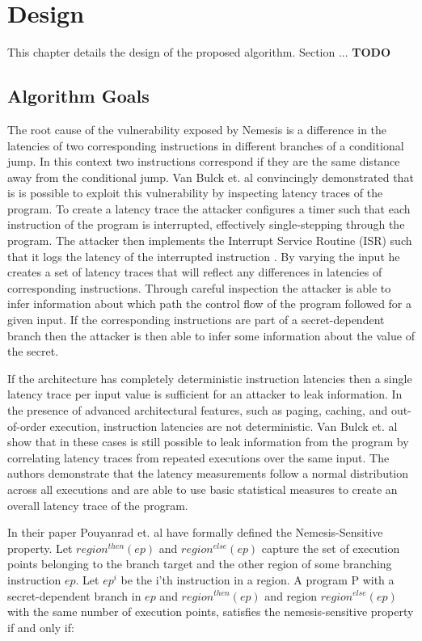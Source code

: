 \chapter{Design}
\label{cha:design}

This chapter details the design of the proposed algorithm. Section ... \textbf{TODO}

\section{Algorithm Goals}
\label{sec:goals}
The root cause of the vulnerability exposed by Nemesis is a difference in the latencies of two corresponding instructions in different branches of a 
conditional jump. 
In this context two instructions correspond if they are the same distance away from the conditional jump. 
Van Bulck et. al \cite{Nemesis} convincingly demonstrated that is is possible to exploit this vulnerability by inspecting latency traces of the program.
To create a latency trace the attacker configures a timer such that each instruction of the program is interrupted, effectively single-stepping through the program. 
The attacker then implements the Interrupt Service Routine (ISR) such that it logs the latency of the interrupted instruction \cite{nemesisrepo, sancussupport}.
By varying the input he creates a set of latency traces that will reflect any differences in latencies of corresponding instructions.
Through careful inspection the attacker is able to infer information about which path the control flow of the program followed for a given input. 
If the corresponding instructions are part of a secret-dependent branch then the attacker is then able to infer some information about the value of the secret. 

If the architecture has completely deterministic instruction latencies then a single latency trace per input value is sufficient for an attacker to leak information.
In the presence of advanced architectural features, such as paging, caching, and out-of-order execution, instruction latencies are not deterministic. 
Van Bulck et. al \cite{Nemesis} show that in these cases is still possible to leak information from the program by correlating latency traces from repeated executions over the same input. 
The authors demonstrate that the latency measurements follow a normal distribution across all executions and are able to use basic statistical measures to create an overall latency trace 
of the program. 
	
In their paper Pouyanrad et. al have formally defined the Nemesis-Sensitive property.
Let $region^{then}(ep)$ and $region^{else}(ep)$ capture the set of execution points belonging to the branch target and the other region of some branching instruction $ep$.
Let $ep^i$ be the i'th instruction in a region. A program P with a secret-dependent branch in $ep$ and $region^{then}(ep)$ 
and region $region^{else}(ep)$ with the same number of execution points, satisfies the nemesis-sensitive property if and only if:  

